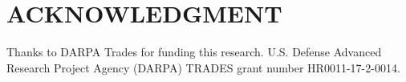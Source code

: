 \documentclass[letterpaper, 10 pt, conference]{ieeeconf}  %
\begin{document}
\addtolength{\textheight}{-12cm}   %








\section{ACKNOWLEDGMENT}

Thanks to DARPA Trades for funding this research. 
U.S. Defense Advanced Research Project Agency (DARPA) TRADES grant number HR0011-17-2-0014.
\end{document}

